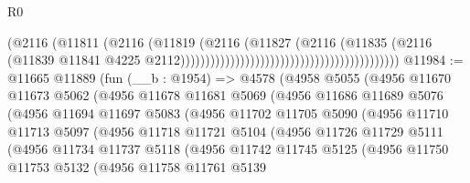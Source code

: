 \begin{lexlean}{R0}
\begin{coremodule}
                                                                        (@2116
                                                                          (@11811
                                                                            (@2116
                                                                              (@11819
                                                                                (@2116
                                                                                  (@11827
                                                                                    (@2116
                                                                                      (@11835
                                                                                        (@2116
                                                                                          (@11839
                                                                                            @11841
                                                                                            @4225
                                                                                            @2112))))))))))))))))))))))))))))))))))))))))))))
@11984 := @11665
    @11889
    (fun (__b : @1954) =>
    @4578
      (@4958
        @5055
        (@4956
          @11670
          @11673
          @5062
          (@4956
            @11678
            @11681
            @5069
            (@4956
              @11686
              @11689
              @5076
              (@4956
                @11694
                @11697
                @5083
                (@4956
                  @11702
                  @11705
                  @5090
                  (@4956
                    @11710
                    @11713
                    @5097
                    (@4956
                      @11718
                      @11721
                      @5104
                      (@4956
                        @11726
                        @11729
                        @5111
                        (@4956
                          @11734
                          @11737
                          @5118
                          (@4956
                            @11742
                            @11745
                            @5125
                            (@4956
                              @11750
                              @11753
                              @5132
                              (@4956
                                @11758
                                @11761
                                @5139

\end{coremodule}
\end{lexlean}

